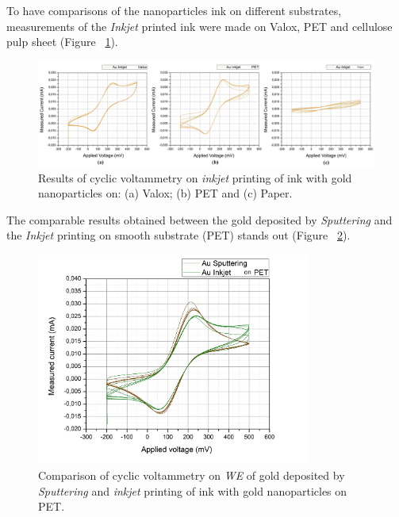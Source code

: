 To have comparisons of the nanoparticles ink on different substrates, measurements of the \textit{Inkjet} printed ink were made on Valox, PET and cellulose pulp sheet (Figure ~\ref{fig:Figura_EQ_Inkjet_Valox_PET_Papel}).

\begin{figure}[H]
  \centering
    \includegraphics[width=1\textwidth]{Figures/Figura_EQ_Inkjet_Valox_PET_Papel}
  \caption{Results of cyclic voltammetry on \textit{inkjet} printing of ink with gold nanoparticles on: (a) Valox; (b) PET and (c) Paper.}
  \label{fig:Figura_EQ_Inkjet_Valox_PET_Papel}
\end{figure}

The comparable results obtained between the gold deposited by \textit{Sputtering} and the \textit{Inkjet} printing on smooth substrate (PET) stands out (Figure ~\ref{fig:Figura_EQ_Sputt_Inkjet_PET}).

\begin{figure}[H]
  \centering
    \includegraphics[width=0.8\textwidth]{Figures/Figura_EQ_Sputt_Inkjet_PET}
  \caption{Comparison of cyclic voltammetry on \emph{WE} of gold deposited by \textit{Sputtering} and \textit{inkjet} printing of ink with gold nanoparticles on PET.}
  \label{fig:Figura_EQ_Sputt_Inkjet_PET}
\end{figure}